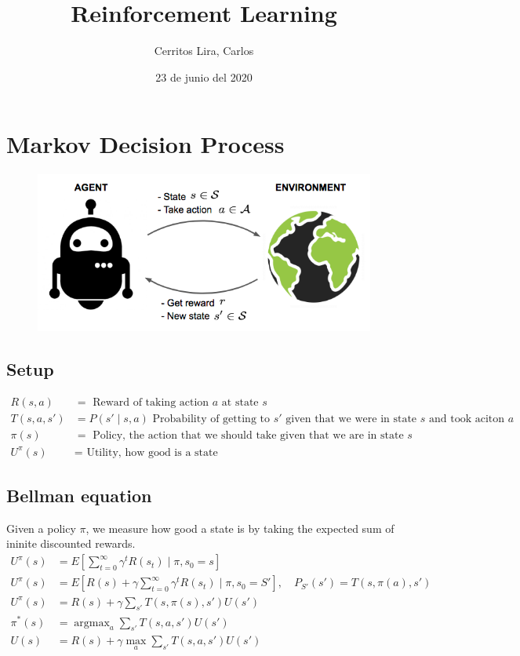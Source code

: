 \documentclass{article}
\title{Reinforcement Learning}
\author{Cerritos Lira, Carlos}
\date{23 de junio del 2020}
\DeclareMathOperator*{\argmax}{argmax} %
\begin{document}
\maketitle
\section*{Markov Decision Process}
\begin{figure}[H]
    \centering
    \includegraphics[scale=0.5]{images/mdp.png}
\end{figure}
\subsection*{Setup}
\begin{align*}
    R(s,a) &= \text{ Reward of taking action $a$ at state $s$} \\
    T(s,a,s') &= P(s' \mid s,a) \text{ Probability of getting to $s'$ given that we were in state $s$ and took aciton $a$} \\
    \pi(s) &= \text{ Policy, the action that we should take given that we are in state $s$} \\
    U^\pi(s) &= \text{ Utility, how good is a state}
\end{align*}
\subsection*{Bellman equation}
Given a policy $\pi$, we measure how good a state is by taking the expected sum of ininite discounted rewards.
\begin{align*}
    U^\pi(s) &= E[\sum_{t=0}^\infty \gamma^t R(s_t) \mid \pi, s_0=s] \\
    U^\pi(s) &= E[R(s) + \gamma \sum_{t=0}^\infty \gamma^tR(s_t) \mid \pi, s_0=S'], \quad P_{S'}(s')=T(s,\pi(a),s') \\
    U^\pi(s) &= R(s) + \gamma \sum_{s'} T(s,\pi(s),s')U(s') \\
    \pi^*(s) &= \argmax_{a} \sum_{s'} T(s,a,s')U(s') \\
    U(s) &= R(s) + \gamma \max_{a} \sum_{s'} T(s,a,s')U(s') 
\end{align*}
\end{document}
